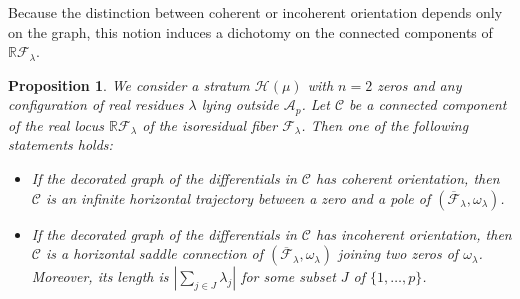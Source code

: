 \documentclass[11pt]{article}
\newtheorem{prop}[thm]{Proposition}
\theoremstyle{definition}
\begin{document}
Because the distinction between coherent or incoherent orientation depends only on the graph, this notion induces a dichotomy on the connected components of $\mathbb{R}\mathcal{F}_{\lambda}$.

\begin{prop}\label{prop:REALlocus}
We consider a stratum $\mathcal{H}(\mu)$ with $n=2$ zeros and any configuration of real residues $\lambda$ lying outside $\mathcal{A}_{p}$. Let $\mathcal{C}$ be a connected component of the real locus $\mathbb{R}\mathcal{F}_{\lambda}$ of the isoresidual fiber $\mathcal{F}_{\lambda}$. Then one of the following statements holds:
\begin{itemize}
\item If the decorated graph of the differentials in $\mathcal{C}$ has coherent orientation, then $\mathcal{C}$ is an infinite horizontal trajectory between a zero and a pole of $(\overline{\mathcal{F}}_{\lambda},\omega_{\lambda})$.
\item If the decorated graph of the differentials in $\mathcal{C}$ has incoherent orientation, then $\mathcal{C}$ is a horizontal saddle connection of $(\overline{\mathcal{F}}_{\lambda},\omega_{\lambda})$ joining two zeros of $\omega_{\lambda}$. Moreover, its length is $|\sum_{j \in J} \lambda_{j}|$ for some subset $J$ of $\lbrace{ 1,\dots,p \rbrace}$.
\end{itemize}
\end{prop}
\end{document}
